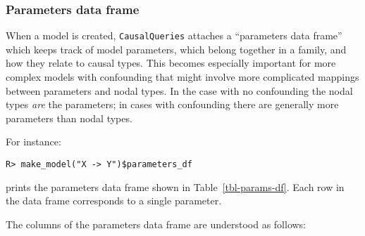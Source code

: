 \documentclass[
  11pt,
  article]{jss}
\begin{document}
\hypertarget{sec-param-df}{%
\subsubsection{Parameters data frame}\label{sec-param-df}}

When a model is created, \texttt{CausalQueries} attaches a ``parameters
data frame'' which keeps track of model parameters, which belong
together in a family, and how they relate to causal types. This becomes
especially important for more complex models with confounding that might
involve more complicated mappings between parameters and nodal types. In
the case with no confounding the nodal types \emph{are} the parameters;
in cases with confounding there are generally more parameters than nodal
types.

For instance:

\begin{verbatim}
R> make_model("X -> Y")$parameters_df
\end{verbatim}

\hypertarget{tbl-params-df}{}
\begin{table}
\caption{\label{tbl-params-df}Example of Parameters Data Frame }\tabularnewline

\centering
{}
\end{table}

prints the parameters data frame shown in Table~\ref{tbl-params-df}.
Each row in the data frame corresponds to a single parameter.

The columns of the parameters data frame are understood as follows:
\end{document}
